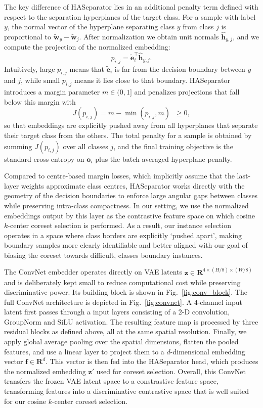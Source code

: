 \documentclass{article}
\newcommand{\quoted}[1]{`#1'}
\begin{document}
The key difference of HASeparator lies in an additional penalty term
defined with respect to the separation hyperplanes of the target class.
For a sample with label $y$, the normal vector of the hyperplane
separating class $y$ from class $j$ is proportional to
$\tilde{\mathbf{w}}_y - \tilde{\mathbf{w}}_j$. 
After normalization we obtain unit normals $\hat{\mathbf{h}}_{y,j}$, and we compute the
projection of the normalized embedding:
\[
p_{i,j} = \tilde{\mathbf{e}}_i^\top \hat{\mathbf{h}}_{y,j}.
\]
Intuitively, large $p_{i,j}$ means that $\tilde{\mathbf{e}}_i$ is far
from the decision boundary between $y$ and $j$, while small $p_{i,j}$ 
means it lies close to that boundary. 
HASeparator introduces a margin parameter $m \in (0,1]$ and penalizes 
projections that fall below this margin with
\[
J(p_{i,j}) = m - \min(p_{i,j}, m) \;\; \ge 0,
\]
so that embeddings are explicitly pushed away from all hyperplanes that
separate their target class from the others. 
The total penalty for a sample is obtained by summing $J(p_{i,j})$ over all classes $j$, 
and the final training objective is the standard cross-entropy on
$\mathbf{o}_i$ plus the batch-averaged hyperplane penalty.

Compared to centre-based margin losses, which implicitly assume that 
the last-layer weights approximate class centres, HASeparator works
directly with the geometry of the decision boundaries to enforce large
angular gaps between classes while preserving intra-class compactness.
In our setting, we use the normalized embeddings output by this layer
as the contrastive feature space on which cosine $k$-center coreset
selection is performed. As a result, our instance selection operates in
a space where class borders are explicitly \quoted{pushed apart}, making
boundary samples more clearly identifiable and better aligned with our
goal of biasing the coreset towards difficult, classes boundary
instances.

The ConvNet embedder operates directly on VAE latents $\mathbf{z} \in \mathbf{R}^{4 \times (H/8) \times (W/8)}$ and is
deliberately kept small to reduce computational cost while preserving discriminative power. 
Its building block is shown in Fig.~\ref{fig:conv_block}.
The full ConvNet architecture is depicted in Fig.~\ref{fig:convnet}. 
A $4$-channel input latent first passes through a input layers consisting of a 2-D convolution, GroupNorm and SiLU activation.
The resulting feature map is processed by three residual blocks as defined above, all at the same spatial resolution.
Finally, we apply global average pooling over the spatial dimensions, flatten the pooled features, and use a linear
layer to project them to a $d$-dimensional embedding vector $\mathbf{f} \in \mathbf{R}^{d}$.
This vector is then fed into the HASeparator head, which produces the normalized embedding 
$\mathbf{z}'$ used for coreset selection.
Overall, this ConvNet transfers  the frozen VAE latent space to a constrastive feature space, 
transforming features into a discriminative contrastive space that is well suited for our cosine $k$-center coreset selection.
\end{document}
